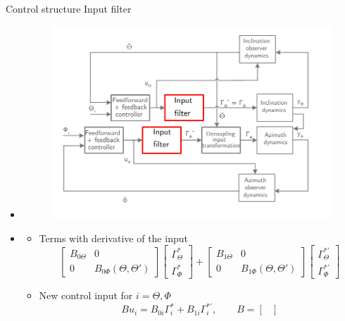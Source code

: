 \documentclass{beamer}
\begin{document}
\begin{frame}{Control structure}
Input filter
\begin{itemize}
\item <1|only@1> [] \begin{figure}[ht]\centering
	\includegraphics[width=1\textwidth]{images/ControlStrategy2.pdf}
\end{figure}
\item <2|only@2> []\begin{itemize}
 \item Terms with derivative of the input
 \begin{equation*}
			\begin{bmatrix}
			B_{0\Theta} & 0\\
			0 & \boxed{B_{0\Phi}(\Theta,\Theta')}
			\end{bmatrix} 
			\begin{bmatrix}
			\Gamma_\Theta^* \\
			\Gamma_\Phi^*
			\end{bmatrix} +
			\begin{bmatrix}
			B_{1\Theta} & 0\\
			0 & \boxed{B_{1\Phi}(\Theta,\Theta')}
			\end{bmatrix} 
			\begin{bmatrix}
			\Gamma_\Theta^{*'} \\
			\Gamma_\Phi^{*'}
			\end{bmatrix}
\end{equation*}
\item New control input for $i = \Theta, \Phi$
\begin{equation*}
B u_i = B_{0i} \Gamma_i^* + B_{1i} \Gamma_i^{*'}, \qquad B=\begin{bmatrix}

\end{bmatrix}
\end{equation*}
\end{itemize}
\end{itemize}
\end{frame}
\end{document}
